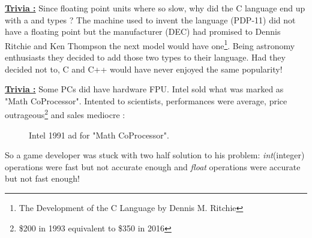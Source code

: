 \documentclass[book.tex]{subfiles}
\begin{document}
 \textbf{\underline{Trivia :}} Since floating point units where so slow, why did the C language end up with a  and  types ? The machine used to invent the language (PDP-11) did not have a floating point but the manufacturer (DEC) had promised to Dennis Ritchie and Ken Thompson the next model would have one\footnote{The Development of the C Language by Dennis M. Ritchie}. Being astronomy enthusiasts they decided to add those two types to their language. Had they decided not to, C and C++ would have never enjoyed the same popularity!
\par
\textbf{\underline{Trivia :}} Some PCs did have hardware FPU. Intel sold what was marked as "Math CoProcessor". Intented to scientists, performances were average, price outrageous\footnote{\$200 in 1993 equivalent to \$350 in 2016} and sales mediocre :\\
\begin{figure}[H]
\centering
\caption{Intel 1991 ad for "Math CoProcessor".}
\label{fig:fp_internals}
\end{figure}



\bigskip
So a game developer was stuck with two half solution to his problem: \emph{int}(integer) operations were fast but not accurate enough and \emph{float} operations were accurate but not fast enough!
   
\end{document}
